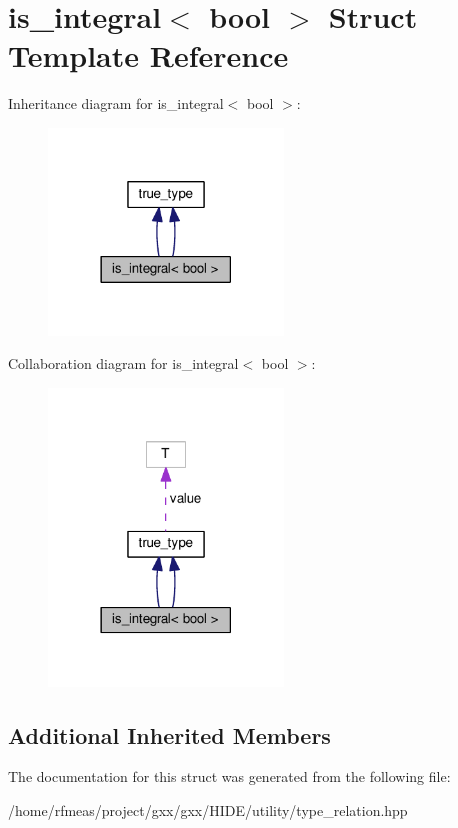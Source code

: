 \hypertarget{structis__integral_3_01bool_01_4}{}\section{is\+\_\+integral$<$ bool $>$ Struct Template Reference}
\label{structis__integral_3_01bool_01_4}


Inheritance diagram for is\+\_\+integral$<$ bool $>$\+:
\nopagebreak
\begin{figure}[H]
\begin{center}
\leavevmode
\includegraphics[width=177pt]{structis__integral_3_01bool_01_4__inherit__graph}
\end{center}
\end{figure}


Collaboration diagram for is\+\_\+integral$<$ bool $>$\+:
\nopagebreak
\begin{figure}[H]
\begin{center}
\leavevmode
\includegraphics[width=177pt]{structis__integral_3_01bool_01_4__coll__graph}
\end{center}
\end{figure}
\subsection*{Additional Inherited Members}


The documentation for this struct was generated from the following file\+:\begin{DoxyCompactItemize}
\item 
/home/rfmeas/project/gxx/gxx/\+H\+I\+D\+E/utility/type\+\_\+relation.\+hpp\end{DoxyCompactItemize}
